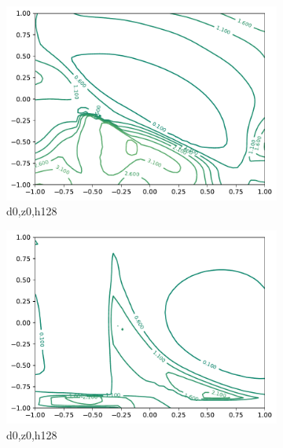 \documentclass{article}
\begin{document}
\begin{figure}
    \centering
    \begin{subfigure}[b]{0.3\textwidth}
        \centering
		\includegraphics[width=\textwidth]{report_images/d0_z0_h128_2D_1.pdf}
		\caption{d0,z0,h128}
    \end{subfigure}
    \begin{subfigure}[b]{0.3\textwidth}
        \centering
		\includegraphics[width=\textwidth]{report_images/d0_z0_h128_2D_2.pdf}
		\caption{d0,z0,h128}
    \end{subfigure}
    \begin{subfigure}[b]{0.3\textwidth}
        \centering

\end{subfigure}
\end{figure}
\end{document}
